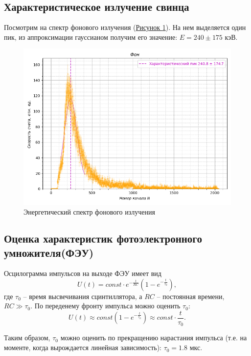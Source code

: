 \documentclass{article}
\begin{document}
\subsection{Характеристическое излучение свинца}
Посмотрим на спектр фонового излучения (\hyperref[fone]{Рисунок \ref*{fone}}). На нем выделяется один пик, из аппроксимации гауссианом получим его значение: $E = 240 \pm 175 \text{ кэВ}$. 

\begin{figure}[h!]
        \centering
        \includegraphics[width = 10 cm]{BBGG.png}
        \caption{Энергетический спектр фонового излучения}
        \label{fone}
    \end{figure}



\subsection{Оценка характеристик фотоэлектронного умножителя(ФЭУ)}
Осцилограмма импульсов на выходе ФЭУ имеет вид
    \begin{equation}
        U(t) = const \cdot e^{-\frac{t}{RC}} \left( 1 - e^{-\frac{t}{\tau_0}} \right),
    \end{equation}
    где $\tau_0$ -- время высвечивания сцинтиллятора, а $RC$ -- постоянная времени, $RC \gg \tau_0$.
По переденему фронту импульса можно оценить $\tau_0$:
    \begin{equation}
        U(t) \approx const \left( 1 - e^{-\frac{t}{\tau_0}} \right) \approx const \cdot \frac{t}{\tau_0}.
    \end{equation}

    Таким образом, $\tau_0$ можно оценить по прекращению нарастания импульса (т.е. на моменте, когда вырождается линейная зависимость): $\tau_0 = 1.8$ мкс. 
\end{document}
